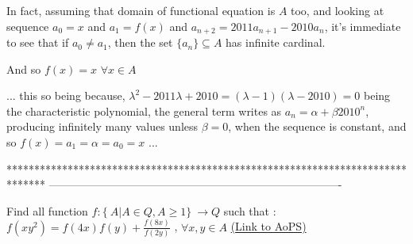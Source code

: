 \begin{solution}
	In fact, assuming that domain of functional equation is $A$ too, and looking at sequence $a_0=x$ and $a_1=f(x)$ and $a_{n+2}=2011a_{n+1}-2010a_n$, it's immediate to see that if $a_0\ne a_1$, then the set $\{a_n\}\subseteq A$ has infinite cardinal.

And so $f(x)=x$ $\forall x\in A$
\end{solution}



\begin{solution}
	... this so being because, $\lambda^2 - 2011\lambda + 2010 = (\lambda-1)(\lambda - 2010) = 0$ being the characteristic polynomial, the general term writes as $a_n = \alpha + \beta 2010^n$, producing infinitely many values unless $\beta = 0$, when the sequence is constant, and so $f(x) = a_1 = \alpha = a_0 = x$ ...
\end{solution}
*******************************************************************************
-------------------------------------------------------------------------------

\begin{problem}
	Find all function $f: \{\ A|A\in Q , A\geq{1}\}\ \to Q$ such that : $f(xy^2)=f(4x)f(y)+\frac{f(8x)}{f(2y)}$ , $\forall x,y \in A$
	\flushright \href{https://artofproblemsolving.com/community/c6h487443}{(Link to AoPS)}
\end{problem}



